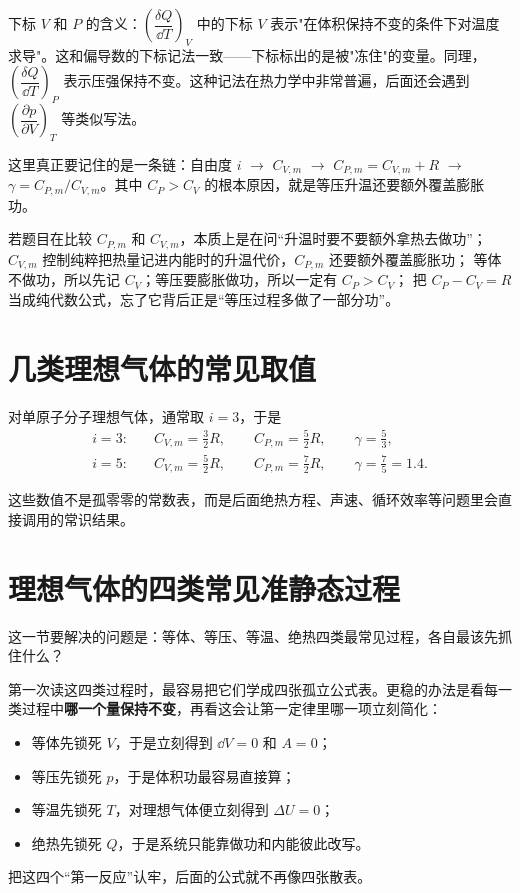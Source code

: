\documentclass[lang=cn,11pt]{elegantbook}
\newcommand{\bridge}[1]{\begin{note}#1\end{note}}
\begin{document}
\begin{remark}
下标 \(V\) 和 \(P\) 的含义：\(\left(\dfrac{\delta Q}{\dd T}\right)_V\) 中的下标 \(V\) 表示"在体积保持不变的条件下对温度求导"。这和偏导数的下标记法一致——下标标出的是被"冻住"的变量。同理，\(\left(\dfrac{\delta Q}{\dd T}\right)_P\) 表示压强保持不变。这种记法在热力学中非常普遍，后面还会遇到 \(\left(\dfrac{\partial p}{\partial V}\right)_T\) 等类似写法。
\end{remark}

\bridge{这里真正要记住的是一条链：自由度 \(i\) \(\to\) \(C_{V,m}\) \(\to\) \(C_{P,m}=C_{V,m}+R\) \(\to\) \(\gamma=C_{P,m}/C_{V,m}\)。其中 \(C_P>C_V\) 的根本原因，就是等压升温还要额外覆盖膨胀功。}

\begin{note}
 若题目在比较 \(C_{P,m}\) 和 \(C_{V,m}\)，本质上是在问“升温时要不要额外拿热去做功”； \(C_{V,m}\) 控制纯粹把热量记进内能时的升温代价，\(C_{P,m}\) 还要额外覆盖膨胀功； 等体不做功，所以先记 \(C_V\)；等压要膨胀做功，所以一定有 \(C_P>C_V\)； 把 \(C_P-C_V=R\) 当成纯代数公式，忘了它背后正是“等压过程多做了一部分功”。
\end{note}

\section{几类理想气体的常见取值}

对单原子分子理想气体，通常取 \(i=3\)，于是
\begin{align*}
i=3:\quad &C_{V,m}=\frac{3}{2}R,\qquad C_{P,m}=\frac{5}{2}R,\qquad \gamma=\frac{5}{3},\\
i=5:\quad &C_{V,m}=\frac{5}{2}R,\qquad C_{P,m}=\frac{7}{2}R,\qquad \gamma=\frac{7}{5}=1.4.
\end{align*}

\begin{remark}
这些数值不是孤零零的常数表，而是后面绝热方程、声速、循环效率等问题里会直接调用的常识结果。
\end{remark}

\section{理想气体的四类常见准静态过程}

这一节要解决的问题是：等体、等压、等温、绝热四类最常见过程，各自最该先抓住什么？

第一次读这四类过程时，最容易把它们学成四张孤立公式表。更稳的办法是看每一类过程中\textbf{哪一个量保持不变}，再看这会让第一定律里哪一项立刻简化：
\begin{itemize}
 \item 等体先锁死 \(V\)，于是立刻得到 \(\dd V=0\) 和 \(A=0\)；
 \item 等压先锁死 \(p\)，于是体积功最容易直接算；
 \item 等温先锁死 \(T\)，对理想气体便立刻得到 \(\Delta U=0\)；
 \item 绝热先锁死 \(Q\)，于是系统只能靠做功和内能彼此改写。
\end{itemize}
把这四个“第一反应”认牢，后面的公式就不再像四张散表。
\end{document}
